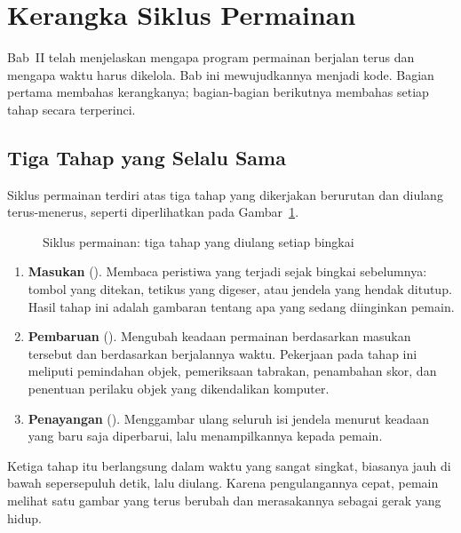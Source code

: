 \section{Kerangka Siklus Permainan}
\label{sec:kerangka-siklus}

Bab~II telah menjelaskan mengapa program permainan berjalan terus dan
mengapa waktu harus dikelola. Bab ini mewujudkannya menjadi kode. Bagian
pertama membahas kerangkanya; bagian-bagian berikutnya membahas setiap tahap
secara terperinci.

\subsection{Tiga Tahap yang Selalu Sama}

Siklus permainan terdiri atas tiga tahap yang dikerjakan berurutan dan
diulang terus-menerus, seperti diperlihatkan pada
Gambar~\ref{fig:siklus-game-loop}.

\begin{figure}[htbp]
\centering

\caption{Siklus permainan: tiga tahap yang diulang setiap bingkai}
\label{fig:siklus-game-loop}
\end{figure}

\begin{enumerate}
  \item \textbf{Masukan} (). Membaca peristiwa yang terjadi sejak
        bingkai sebelumnya: tombol yang ditekan, tetikus yang digeser, atau
        jendela yang hendak ditutup. Hasil tahap ini adalah gambaran tentang
        apa yang sedang diinginkan pemain.
  \item \textbf{Pembaruan} (). Mengubah keadaan permainan
        berdasarkan masukan tersebut dan berdasarkan berjalannya waktu.
        Pekerjaan pada tahap ini meliputi pemindahan objek, pemeriksaan
        tabrakan, penambahan skor, dan penentuan perilaku objek yang
        dikendalikan komputer.
  \item \textbf{Penayangan} (). Menggambar ulang seluruh isi
        jendela menurut keadaan yang baru saja diperbarui, lalu
        menampilkannya kepada pemain.
\end{enumerate}

Ketiga tahap itu berlangsung dalam waktu yang sangat singkat, biasanya jauh
di bawah sepersepuluh detik, lalu diulang. Karena pengulangannya cepat,
pemain melihat satu gambar yang terus berubah dan merasakannya sebagai gerak
yang hidup.

